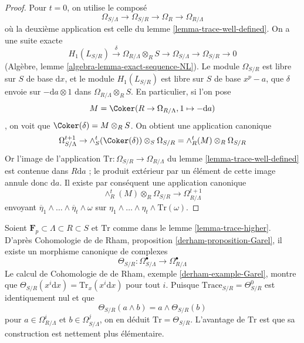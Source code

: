 \begin{proof} Pour $t = 0$, on utilise le composé $$
\Omega_{S/\Lambda} \to \Omega_{S/R} \to \Omega_R \to \Omega_{R/\Lambda}
$$ où la deuxième application est celle du lemme \ref{lemma-trace-well-defined}. On a une suite exacte $$
H_1(L_{S/R}) \xrightarrow{\delta} \Omega_{R/\Lambda} \otimes_R S \to
\Omega_{S/\Lambda} \to \Omega_{S/R} \to 0
$$ (Algèbre, lemme \ref{algebra-lemma-exact-sequence-NL}). Le module $\Omega_{S/R}$ est libre sur $S$ de base $\text{d}x$, et le module $H_1(L_{S/R})$ est libre sur $S$ de base $x^p - a$, que $\delta$ envoie sur $-\text{d}a \otimes 1$ dans $\Omega_{R/\Lambda} \otimes_R S$. En particulier, si l'on pose $$
M = \Coker(R \to \Omega_{R/\Lambda}, 1 \mapsto -\text{d}a)
$$, on voit que $\Coker(\delta) = M \otimes_R S$. On obtient une application canonique $$
\Omega^{t + 1}_{S/\Lambda} \to
\wedge_S^t(\Coker(\delta)) \otimes_S \Omega_{S/R} =
\wedge^t_R(M) \otimes_R \Omega_{S/R}
$$ Or l'image de l'application $\text{Tr} : \Omega_{S/R} \to \Omega_{R/\Lambda}$ du lemme \ref{lemma-trace-well-defined} est contenue dans $R\text{d}a$ ; le produit extérieur par un élément de cette image annule donc $\text{d}a$. Il existe par conséquent une application canonique $$
\wedge^t_R(M) \otimes_R \Omega_{S/R} \to \Omega_{R/\Lambda}^{t + 1}
$$ envoyant $\overline{\eta}_1 \wedge \ldots \wedge \overline{\eta}_t \wedge \omega$ sur $\eta_1 \wedge \ldots \wedge \eta_t \wedge \text{Tr}(\omega)$. \end{proof}

\begin{remark} \label{remark-compare-Garel} Soient $\mathbf{F}_p \subset \Lambda \subset R \subset S$ et $\text{Tr}$ comme dans le lemme \ref{lemma-trace-higher}. D'après Cohomologie de de Rham, proposition \ref{derham-proposition-Garel}, il existe un morphisme canonique de complexes $$
\Theta_{S/R} :
\Omega_{S/\Lambda}^\bullet
\longrightarrow
\Omega_{R/\Lambda}^\bullet
$$ Le calcul de Cohomologie de de Rham, exemple \ref{derham-example-Garel}, montre que $\Theta_{S/R}(x^i \text{d}x) = \text{Tr}_x(x^i\text{d}x)$ pour tout $i$. Puisque $\text{Trace}_{S/R} = \Theta^0_{S/R}$ est identiquement nul et que $$
\Theta_{S/R}(a \wedge b) = a \wedge \Theta_{S/R}(b)
$$ pour $a \in \Omega^i_{R/\Lambda}$ et $b \in \Omega^j_{S/\Lambda}$, on en déduit $\text{Tr} = \Theta_{S/R}$. L'avantage de $\text{Tr}$ est que sa construction est nettement plus élémentaire. \end{remark}

